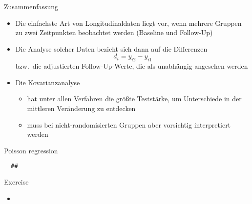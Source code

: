 \documentclass{beamer}
\begin{document}
\begin{frame}{Zusammenfassung}
\begin{itemize}
  \item Die einfachste Art von Longitudinaldaten liegt vor, wenn mehrere Gruppen zu zwei Zeitpunkten beobachtet werden (Baseline und Follow-Up)
  \item Die Analyse solcher Daten bezieht sich dann auf die Differenzen
    \[
        d_i = y_{i2} - y_{i1}
    \]
    bzw.\ die adjustierten Follow-Up-Werte, die als unabhängig angesehen werden
  \item Die Kovarianzanalyse
  \begin{itemize}
    \item hat unter allen Verfahren die größte Teststärke, um Unterschiede in der mittleren Veränderung zu entdecken
    \item muss bei nicht-randomisierten Gruppen aber vorsichtig interpretiert werden
  \end{itemize}
\end{itemize}
\end{frame}


{

\begin{frame}[fragile]{Poisson regression}
  \begin{lstlisting}
  ##\end{lstlisting}
\end{frame}

}

\begin{frame}[fragile]{}
  \begin{block}{Exercise}
    \begin{itemize}
      \item 
    \end{itemize}
  \end{block}
\end{frame}

% 
% 
\end{document}
